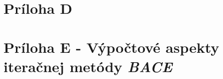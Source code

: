 \documentclass[a4paper,12pt,twoside]{article}
\theoremstyle{comment}
\begin{document}
  \newpage
  \section*{Príloha D} 
    \label{appendix:d}
    

  \newpage
  \section*{Príloha E - Výpočtové aspekty iteračnej metódy \emph{BACE}}
    \label{appendix:e}
    
\end{document}
